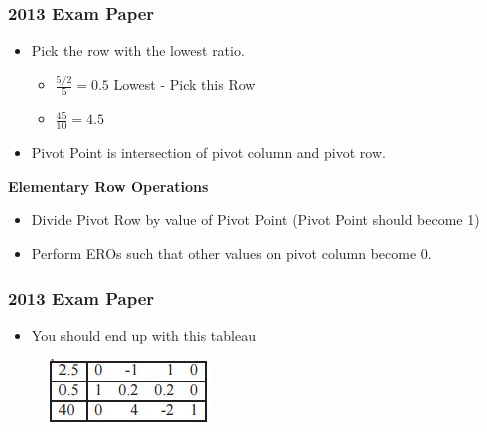\documentclass{beamer}
\begin{document}
\begin{frame}
	\frametitle{2013 Exam Paper}
	\large
	\begin{itemize}
\item Pick the row with the lowest ratio. \bigskip
{ 
\Large
\begin{itemize}
\item $\frac{5/2}{5} =0.5 $ Lowest - Pick this Row \bigskip
\item $\frac{45}{10} =4.5 $ \bigskip
\end{itemize}
}\item Pivot Point is intersection of pivot column and pivot row.
\end{itemize}	
\noindent \textbf{Elementary Row Operations}
\begin{itemize}
\item Divide Pivot Row by value of Pivot Point (Pivot Point should become 1)
\item Perform EROs such that other values on pivot column become 0.
\end{itemize}
	
	
\end{frame}
\begin{frame}
	\frametitle{2013 Exam Paper}
	\large
	\begin{itemize}
		\item  You should end up with this tableau
	\end{itemize}
	
	\begin{figure}
		\centering
		\includegraphics[width=0.7\linewidth]{exam13-a}
		
	\end{figure}
	
\end{frame}
\end{document}

